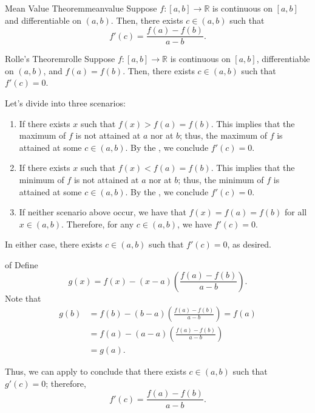\begin{thm}{Mean Value Theorem}{meanvalue}
	Suppose \(f\colon [a, b] \to \mathbb{R}\) is continuous on \([a, b]\) and differentiable on \((a, b)\). Then, there exists \(c \in (a, b)\) such that \[
		f'(c) = \frac{f(a) - f(b)}{a - b}.
	\]
\end{thm}

\begin{lem}{Rolle's Theorem}{rolle}
	Suppose \(f\colon [a, b] \to \mathbb{R}\) is continuous on \([a, b]\), differentiable on \((a, b)\), and \(f(a) = f(b)\). Then, there exists \(c \in (a, b)\) such that \(f'(c) = 0\).
\end{lem}

\begin{dem}{}{}
	Let's divide into three scenarios:
	\begin{enumerate}[label = \textbullet]
		\item If there exists \(x\) such that \(f(x) > f(a) = f(b)\). This implies that the maximum of \(f\) is not attained at \(a\) nor at \(b\); thus, the maximum of \(f\) is attained at some \(c \in (a, b)\). By the , we conclude \(f'(c) = 0\).

		\item If there exists \(x\) such that \(f(x) < f(a) = f(b)\). This implies that the minimum of \(f\) is not attained at \(a\) nor at \(b\); thus, the minimum of \(f\) is attained at some \(c \in (a, b)\). By the , we conclude \(f'(c) = 0\).

		\item If neither scenario above occur, we have that \(f(x) = f(a) = f(b)\) for all \(x \in (a, b)\). Therefore, for any \(c \in (a, b)\), we have \(f'(c) = 0\).
	\end{enumerate}

	In either case, there exists \(c \in (a, b)\) such that \(f'(c) = 0\), as desired.
\end{dem}

\begin{dem}{of }{}
	Define \[g(x) = f(x) - (x-a)\left(\frac{f(a) - f(b)}{a - b}\right).\] Note that
	\begin{align*}
		g(b) &= f(b) - (b - a)\left(\frac{f(a) - f(b)}{a - b}\right) = f(a) \\
			 &= f(a) - (a - a)\left(\frac{f(a) - f(b)}{a - b}\right) \\
			 &= g(a).
	\end{align*}

	Thus, we can apply  to conclude that there exists \(c \in (a, b)\) such that \(g'(c) = 0\); therefore, \[
		f'(c) = \frac{f(a) - f(b)}{a - b}.
	\]
\end{dem}

